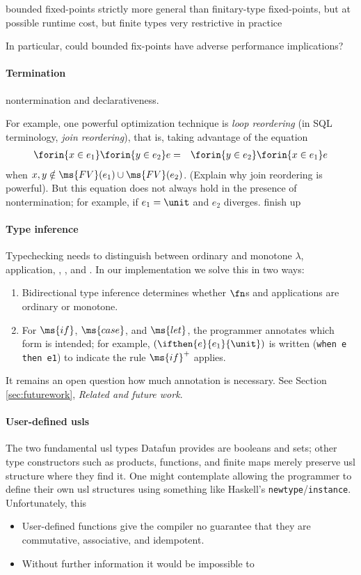\documentclass[preprint]{sigplanconf}
\begin{document}
bounded fixed-points strictly more general than finitary-type fixed-points, but
at possible runtime cost, but finite types very restrictive in practice

\TODO In particular, could bounded fix-points have adverse performance
implications?

\paragraph{Termination} \TODO nontermination and declarativeness.

For example, one powerful optimization technique is \emph{loop reordering} (in
SQL terminology, \emph{join reordering}), that is, taking advantage of the
equation
\begin{eqnarray*}
  \forin{x \in e_1} \forin{y \in e_2} e
  &=& \forin{y \in e_2} \forin{x \in e_1} e
\end{eqnarray*}
when $x,y \notin \ms{FV}(e_1) \cup \ms{FV}(e_2)$. (\TODO Explain why join
reordering is powerful). But this equation does not always hold in the presence
of nontermination; for example, if $e_1 = \unit$ and $e_2$ diverges. \TODO
finish up

\paragraph{Type inference} Typechecking needs to distinguish between ordinary
and monotone $\lambda$, application, , , and . In our
implementation we solve this in two ways:
\begin{enumerate}
\item Bidirectional type inference  determines whether $\fn$s and
  applications are ordinary or monotone.
\item For $\ms{if}$, $\ms{case}$, and $\ms{let}$, the programmer annotates which
  form is intended; for example, $(\ifthen{e}{e_1}{\unit})$ is written
  (\texttt{when e then e1}) to indicate the rule $\ms{if}^+$ applies.
\end{enumerate}

It remains an open question how much annotation is necessary. See
Section \ref{sec:futurework}, \emph{Related and future work}.

\paragraph{User-defined usls}
The two fundamental usl types Datafun provides are booleans and sets; other type
constructors such as products, functions, and finite maps merely preserve usl
structure where they find it. One might contemplate allowing the programmer to
define their own usl structures using something like Haskell's
\texttt{newtype}/\texttt{instance}. Unfortunately, this \TODO
\begin{itemize}
\item User-defined functions give the compiler no guarantee that they are
  commutative, associative, and idempotent.
\item Without further information it would be impossible to
\end{itemize}
\end{document}
